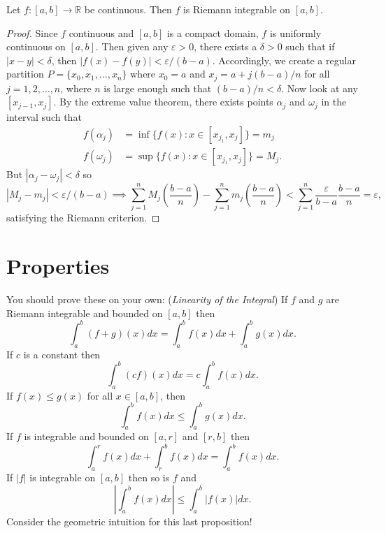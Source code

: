 \documentclass[11pt]{article}
\theoremstyle{definition}
\newcommand{\R}{\mathbb{R}}                      %
\begin{document}
\prop Let $f:[a,b]\to \R$ be continuous. Then  $f$ is Riemann integrable on $[a,b]$.

\begin{proof}
    Since  $f$ continuous and $[a,b]$ is a compact domain, $f$ is uniformly continuous on $[a,b]$. Then given any $\varepsilon>0$, there exists a $\delta>0$ such that if $|x-y|<\delta$, then $|f(x)-f(y)|<\varepsilon/(b-a)$. Accordingly, we create a regular partition $P=\{x_0,x_1,\dots,x_n\}$ where $x_0=a$ and $x_j=a+j(b-a)/n$ for all $j=1,2,\dots,n$, where $n$ is large enough such that $(b-a)/n<\delta$. Now look at any $[x_{j-1},x_j]$. By the extreme value theorem, there exists points $\alpha_j$ and $\omega_j$ in the interval such that 
    \begin{align*}
        f(\alpha_j)&=\inf\{f(x):x\in[x_{j_1},x_j]\}=m_j\\
        f(\omega_j)&=\sup\{f(x):x\in[x_{j_1},x_j]\}=M_j.
    \end{align*}
    But $|\alpha_j-\omega_j|<\delta$ so 
    $$
    |M_j-m_j|<\varepsilon/(b-a)\implies\sum_{j=1}^n M_j\left(\frac{b-a}{n}\right)-\sum_{j=1}^n m_j\left(\frac{b-a}{n}\right)<\sum_{j=1}^n\frac{\varepsilon}{b-a}\frac{b-a}{n}=\varepsilon,
    $$
    satisfying the Riemann criterion.
\end{proof}

\section{Properties}
You should prove these on your own:
\prop (\textit{Linearity of the Integral}) If $f$ and $g$ are Riemann integrable and bounded on $[a,b]$ then
$$
\int_a^b (f+g)(x)dx=\int_a^b f(x)dx+\int_a^b g(x)dx.
$$
If $c$ is a constant then 
$$
\int_a^b(cf)(x)dx=c\int_a^b f(x)dx.
$$
\prop If $f(x)\leq g(x)$ for all $x\in[a,b]$, then 
$$
\int_a^b f(x)dx\leq \int_a^b g(x)dx.
$$
\prop If $f$ is integrable and bounded on $[a,r]$ and $[r,b]$ then 
$$
\int_a^r f(x)dx +\int_r^b f(x)dx=\int_a^b f(x)dx.
$$
\prop If $|f|$ is integrable on $[a,b]$ then so is $f$ and 
$$
\left|\int_a^b f(x)dx\right|\leq \int_a^b |f(x)|dx.
$$
Consider the geometric intuition for this last proposition!
\end{document}
